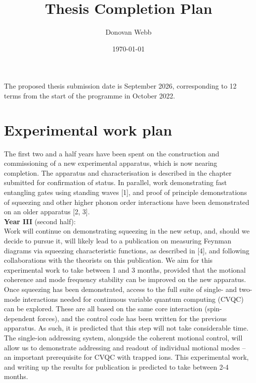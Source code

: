 \documentclass[12pt]{article}
\begin{document}
\title{Thesis Completion Plan}
\author{Donovan Webb}
\date{\today}
\maketitle
\noindent The proposed thesis submission date is September 2026, corresponding to 12 terms from the start of the programme in October 2022.

\section{Experimental work plan}
\noindent The first two and a half years have been spent on the construction and commissioning of a new experimental apparatus, which is now nearing completion. The apparatus and characterisation is described in the chapter submitted for confirmation of status. In parallel, work demonstrating fast entangling gates using standing waves [1], and proof of principle demonstrations of squeezing and other higher phonon order interactions have been demonstrated on an older apparatus [2, 3].\\

\noindent \textbf{Year III} (second half): \\
Work will continue on demonstrating squeezing in the new setup, and, should we decide to pursue it, will likely lead to a publication on measuring Feynman diagrams via squeezing characteristic functions, as described in [4], and following collaborations with the theorists on this publication. We aim for this experimental work to take between 1 and 3 months, provided that the motional coherence and mode frequency stability can be improved on the new apparatus.\\

\noindent Once squeezing has been demonstrated, access to the full suite of single- and two-mode interactions needed for continuous variable quantum computing (CVQC) can be explored. These are all based on the same core interaction (spin-dependent forces), and the control code has been written for the previous apparatus. As such, it is predicted that this step will not take considerable time.\\

\noindent The single-ion addressing system, alongside the coherent motional control, will allow us to demonstrate addressing and readout of individual motional modes -- an important prerequisite for CVQC with trapped ions. This experimental work, and writing up the results for publication is predicted to take between 2-4 months.\\
\end{document}
